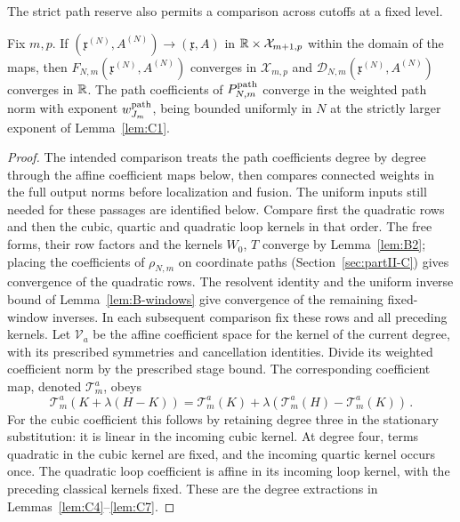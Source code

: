 The strict path reserve also permits a comparison across cutoffs at a fixed level.
\begin{lemma}\label{lem:D-cutoff-continuity}
Fix $m,p$. If $(\mathfrak x^{(N)},A^{(N)})\to(\mathfrak x,A)$ in $\mathbb{R}\times\mathcal X_{m+1,p}$ within the domain of the maps, then $F_{N,m}(\mathfrak x^{(N)},A^{(N)})$ converges in $\mathcal X_{m,p}$ and $\mathcal D_{N,m}(\mathfrak x^{(N)},A^{(N)})$ converges in $\mathbb{R}$. The path coefficients of $P^{\mathrm{path}}_{N,m}$ converge in the weighted path norm with exponent $w^{\rm path}_{J_m}$, being bounded uniformly in $N$ at the strictly larger exponent of Lemma~\ref{lem:C1}.
\end{lemma}
\begin{proof}
The intended comparison treats the path coefficients degree by degree through the affine coefficient maps below, then compares connected weights in the full output norms before localization and fusion. The uniform inputs still needed for these passages are identified below. Compare first the quadratic rows and then the cubic, quartic and quadratic loop kernels in that order. The free forms, their row factors and the kernels $W_0$, $T$ converge by Lemma~\ref{lem:B2}; placing the coefficients of $\rho_{N,m}$ on coordinate paths (Section~\ref{sec:partII-C}) gives convergence of the quadratic rows. The resolvent identity and the uniform inverse bound of Lemma~\ref{lem:B-windows} give convergence of the remaining fixed-window inverses. In each subsequent comparison fix these rows and all preceding kernels. Let $\mathcal V_a$ be the affine coefficient space for the kernel of the current degree, with its prescribed symmetries and cancellation identities. Divide its weighted coefficient norm by the prescribed stage bound. The corresponding coefficient map, denoted $\mathcal T_m^a$, obeys
\begin{equation}\label{eq:D-affine-kernel}
\mathcal T_m^a(K+\lambda(H-K))
=\mathcal T_m^a(K)+\lambda(\mathcal T_m^a(H)-\mathcal T_m^a(K))\,.
\end{equation}
For the cubic coefficient this follows by retaining degree three in the stationary substitution: it is linear in the incoming cubic kernel. At degree four, terms quadratic in the cubic kernel are fixed, and the incoming quartic kernel occurs once. The quadratic loop coefficient is affine in its incoming loop kernel, with the preceding classical kernels fixed. These are the degree extractions in Lemmas~\ref{lem:C4}--\ref{lem:C7}.


\end{proof}
